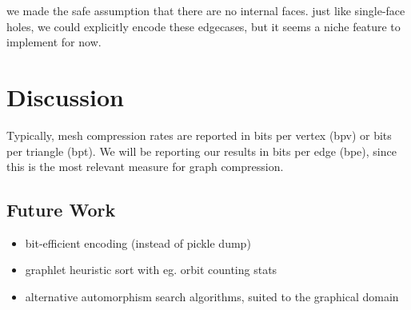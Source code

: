 \documentclass{egpubl}
\begin{document}
we made the safe assumption that there are no internal faces. just like single-face holes, we could explicitly encode these edgecases, but it seems a niche feature to implement for now.



\section{Discussion}


Typically, mesh compression rates are reported in bits per vertex (bpv) or bits per triangle (bpt). We will be reporting our results in bits per edge (bpe), since this is the most relevant measure for graph compression.


\subsection{Future Work}
\begin{itemize}
        \item bit-efficient encoding (instead of pickle dump)
        \item graphlet heuristic sort with eg. orbit counting stats
        \item alternative automorphism search algorithms, suited to the graphical domain
\end{itemize}




%



\end{document}
